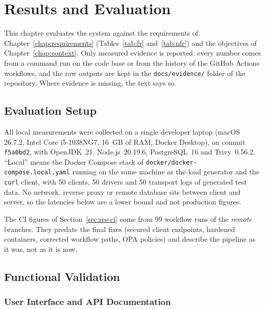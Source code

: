 \chapter{Results and Evaluation}\label{chap:results}

This chapter evaluates the system against the requirements of Chapter~\ref{chap:requirements} (Tables~\ref{tab:fr} and~\ref{tab:nfr}) and the objectives of Chapter~\ref{chap:context}. Only measured evidence is reported: every number comes from a command run on the code base or from the history of the GitHub Actions workflows, and the raw outputs are kept in the \texttt{docs/evidence/} folder of the repository. Where evidence is missing, the text says so.

\section{Evaluation Setup}\label{sec:res-setup-note}

All local measurements were collected on a single developer laptop (macOS 26.7.2, Intel Core i5-1038NG7, 16~GB of RAM, Docker Desktop), on commit \texttt{f5a0bd2}, with OpenJDK~21, Node.js~20.19.6, PostgreSQL~16 and Trivy~0.56.2. ``Local'' means the Docker Compose stack of \texttt{docker/docker-compose.local.yaml} running on the same machine as the load generator and the \texttt{curl} client, with 50 clients, 50 drivers and 50 transport logs of generated test data. No network, reverse proxy or remote database sits between client and server, so the latencies below are a lower bound and not production figures.

The CI figures of Section~\ref{sec:res-ci} come from 99 workflow runs of the \emph{remote} branches. They predate the final fixes (secured client endpoints, hardened containers, corrected workflow paths, OPA policies) and describe the pipeline as it was, not as it is now.

\section{Functional Validation}

\subsection{User Interface and API Documentation}

